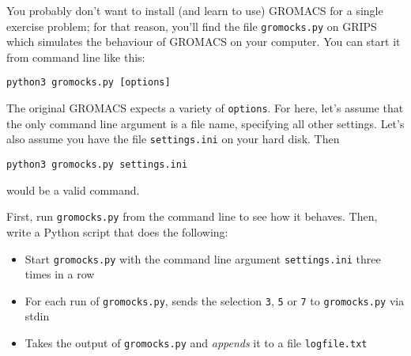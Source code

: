 \documentclass[
	english,
	fontsize=10pt,
	parskip=half,
	titlepage=true,
	DIV=12
]{scrartcl}
\begin{document}
You probably don't want to install (and learn to use) GROMACS for a single exercise problem; for that reason, you'll find the file \texttt{gromocks.py} on GRIPS which simulates the behaviour of GROMACS on your computer. You can start it from command line like this:
\begin{center}
	\texttt{python3 gromocks.py [options]}
\end{center}

The original GROMACS expects a variety of \texttt{options}. For here, let's assume that the only command line argument is a file name, specifying all other settings. Let's also assume you have the file \texttt{settings.ini} on your hard disk. Then
\begin{center}
	\texttt{python3 gromocks.py settings.ini}
\end{center}
would be a valid command.

First, run \texttt{gromocks.py} from the command line to see how it behaves. Then, write a Python script that does the following:
\begin{itemize}
\item Start \texttt{gromocks.py} with the command line argument \texttt{settings.ini} three times in a row
\item For each run of \texttt{gromocks.py}, sends the selection \texttt{3}, \texttt{5} or \texttt{7} to \texttt{gromocks.py} via stdin
\item Takes the output of \texttt{gromocks.py} and \emph{appends} it to a file \texttt{logfile.txt}
\end{itemize}
\end{document}
